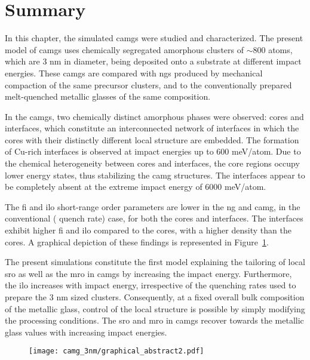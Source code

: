 \section{Summary}
\begin{changebar}
In this chapter, the simulated \cz \gls{camg}s were studied and characterized. The present model of \gls{camg}s uses chemically segregated amorphous \cz clusters of $\sim$800 atoms, which are 3 nm in diameter, being deposited onto a substrate at different impact energies. These \gls{camg}s are compared with \gls{ng}s produced by mechanical compaction of the same precursor clusters, and to the conventionally prepared melt-quenched metallic glasses of the same composition. \par

In the \gls{camg}s, two chemically distinct amorphous phases were observed: cores and interfaces, which constitute an interconnected network of interfaces in which the cores with their distinctly different local structure are embedded. The formation of Cu-rich interfaces is observed at impact energies up to 600 meV/atom. Due to the chemical heterogeneity between cores and interfaces, the core regions occupy lower energy states, thus stabilizing the \gls{camg} structures. The interfaces appear to be completely absent at the extreme impact energy of 6000 meV/atom. \par

The \gls{fi} and \gls{ilo} short-range order parameters are lower in the \gls{ng} and \gls{camg}, in the conventional ( quench rate) case, for both the cores and interfaces. The interfaces exhibit higher \gls{fi} and \gls{ilo} compared to the cores, with a higher density than the cores. A graphical depiction of these findings is represented in Figure~\ref{f:camg-summary}. \par

The present simulations constitute the first model explaining the tailoring of local \gls{sro} as well as the \gls{mro} in \gls{camg}s by increasing the impact energy. Furthermore, the \gls{ilo} increases with impact energy, irrespective of the quenching rates used to prepare the 3 nm sized clusters. Consequently, at a fixed overall bulk composition of the metallic glass, control of the local structure is possible by simply modifying the processing conditions. The \gls{sro} and \gls{mro} in \gls{camg}s recover towards the metallic glass values with increasing impact energies.


\begin{figure}
	\texttt{[image: camg\_3nm/graphical\_abstract2.pdf]}
	\label{f:camg-summary}
\end{figure}
\end{changebar}
